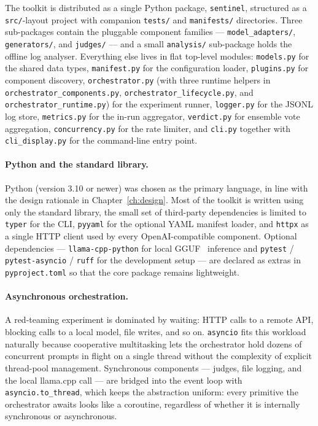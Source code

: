 The toolkit is distributed as a single Python package, \texttt{sentinel}, structured as a \texttt{src/}-layout project with companion \texttt{tests/} and \texttt{manifests/} directories.
Three sub-packages contain the pluggable component families --- \texttt{model\_adapters/}, \texttt{generators/}, and \texttt{judges/} --- and a small \texttt{analysis/} sub-package holds the offline log analyser.
Everything else lives in flat top-level modules: \texttt{models.py} for the shared data types, \texttt{manifest.py} for the configuration loader, \texttt{plugins.py} for component discovery, \texttt{orchestrator.py} (with three runtime helpers in \texttt{orchestrator\_components.py}, \texttt{orchestrator\_lifecycle.py}, and \texttt{orchestrator\_runtime.py}) for the experiment runner, \texttt{logger.py} for the JSONL log store, \texttt{metrics.py} for the in-run aggregator, \texttt{verdict.py} for ensemble vote aggregation, \texttt{concurrency.py} for the rate limiter, and \texttt{cli.py} together with \texttt{cli\_display.py} for the command-line entry point.

\paragraph{Python and the standard library.}
Python (version 3.10 or newer) was chosen as the primary language, in line with the design rationale in Chapter~\ref{ch:design}.
Most of the toolkit is written using only the standard library, the small set of third-party dependencies is limited to \texttt{typer} for the CLI, \texttt{pyyaml} for the optional YAML manifest loader, and \texttt{httpx} as a single HTTP client used by every OpenAI-compatible component.
Optional dependencies --- \texttt{llama-cpp-python} for local GGUF~\cite{gerganov2023gguf} inference and \texttt{pytest} / \texttt{pytest-asyncio} / \texttt{ruff} for the development setup --- are declared as extras in \texttt{pyproject.toml} so that the core package remains lightweight.

\paragraph{Asynchronous orchestration.}
A red-teaming experiment is dominated by waiting: HTTP calls to a remote API, blocking calls to a local model, file writes, and so on.
\texttt{asyncio} fits this workload naturally because cooperative multitasking lets the orchestrator hold dozens of concurrent prompts in flight on a single thread without the complexity of explicit thread-pool management.
Synchronous components --- judges, file logging, and the local llama.cpp call --- are bridged into the event loop with \texttt{asyncio.to\_thread}, which keeps the abstraction uniform: every primitive the orchestrator awaits looks like a coroutine, regardless of whether it is internally synchronous or asynchronous.

